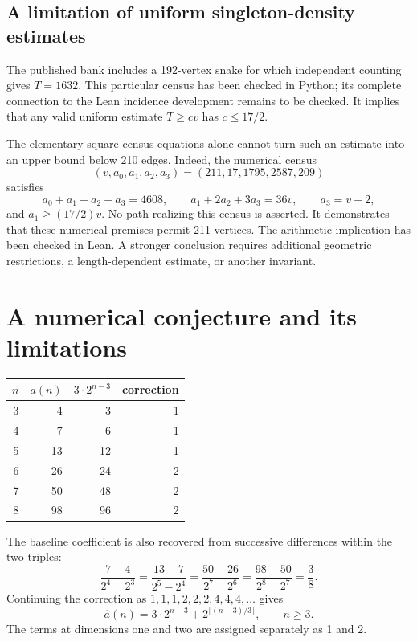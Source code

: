 \documentclass[11pt,a4paper]{article}
\theoremstyle{definition}
\theoremstyle{remark}
\begin{document}
\subsection{A limitation of uniform singleton-density estimates}
The published bank includes a 192-vertex snake for which independent counting gives $T=1632$. This particular census has been checked in Python; its complete connection to the Lean incidence development remains to be checked. It implies that any valid uniform estimate $T\ge cv$ has $c\le17/2$.

The elementary square-census equations alone cannot turn such an estimate into an upper bound below 210 edges. Indeed, the numerical census
\[
(v,a_0,a_1,a_2,a_3)=(211,17,1795,2587,209)
\]
satisfies
\[
a_0+a_1+a_2+a_3=4608,\qquad
 a_1+2a_2+3a_3=36v,\qquad a_3=v-2,
\]
and $a_1\ge(17/2)v$. No path realizing this census is asserted. It demonstrates that these numerical premises permit 211 vertices. The arithmetic implication has been checked in Lean. A stronger conclusion requires additional geometric restrictions, a length-dependent estimate, or another invariant.

\section{A numerical conjecture and its limitations}\label{sec:hypothesis}
\begin{center}
\begin{tabular}{rrrr}
\toprule
$n$ & $a(n)$ & $3\cdot2^{n-3}$ & correction\\
\midrule
3&4&3&1\\4&7&6&1\\5&13&12&1\\
6&26&24&2\\7&50&48&2\\8&98&96&2\\
\bottomrule
\end{tabular}
\end{center}
The baseline coefficient is also recovered from successive differences within the two triples:
\[
\frac{7-4}{2^4-2^3}=\frac{13-7}{2^5-2^4}
=\frac{50-26}{2^7-2^6}=\frac{98-50}{2^8-2^7}=\frac38.
\]
Continuing the correction as $1,1,1,2,2,2,4,4,4,\ldots$ gives
\begin{equation}\label{eq:model}
\widehat a(n)=3\cdot2^{n-3}+2^{\lfloor(n-3)/3\rfloor},\qquad n\ge3.
\end{equation}
The terms at dimensions one and two are assigned separately as 1 and 2.
\end{document}
